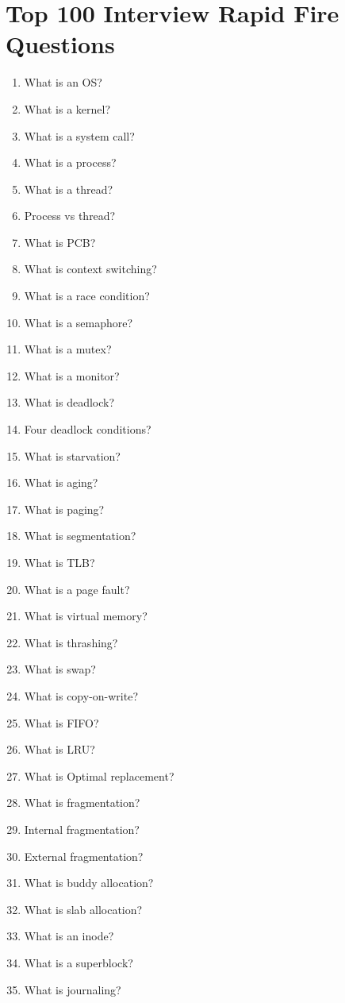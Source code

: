 \section{Top 100 Interview Rapid Fire Questions}

\begin{enumerate}
\item What is an OS?
\item What is a kernel?
\item What is a system call?
\item What is a process?
\item What is a thread?
\item Process vs thread?
\item What is PCB?
\item What is context switching?
\item What is a race condition?
\item What is a semaphore?
\item What is a mutex?
\item What is a monitor?
\item What is deadlock?
\item Four deadlock conditions?
\item What is starvation?
\item What is aging?
\item What is paging?
\item What is segmentation?
\item What is TLB?
\item What is a page fault?
\item What is virtual memory?
\item What is thrashing?
\item What is swap?
\item What is copy-on-write?
\item What is FIFO?
\item What is LRU?
\item What is Optimal replacement?
\item What is fragmentation?
\item Internal fragmentation?
\item External fragmentation?
\item What is buddy allocation?
\item What is slab allocation?
\item What is an inode?
\item What is a superblock?
\item What is journaling?

\end{enumerate}
